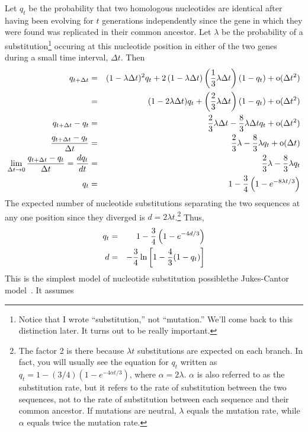 \documentclass[12pt]{article}
\begin{document}
Let $q_t$ be the probability that two homologous nucleotides are
identical after having been evolving for $t$ generations independently
since the gene in which they were found was replicated in their common
ancestor. Let $\lambda$ be the probability of a
substitution\footnote{Notice that I wrote ``substitution,'' not
  ``mutation.'' We'll come back to this distinction later. It turns
  out to be really important.} occuring
at this nucleotide position in either of the two genes during a small
time interval, $\Delta t$. Then
\begin{eqnarray*}
q_{t+\Delta t} &=& (1 - \lambda\Delta t)^2q_t
                  + 2\left(1 - \lambda\Delta t\right)\left({1 \over
                           3}\lambda\Delta t\right)(1 - q_t)
                  + \hbox{o}(\Delta t^2) \\
               &=& (1 - 2\lambda\Delta t)q_t + \left({2 \over 3}\lambda
                                                    \Delta t\right)
                                              (1 - q_t)
                  + \hbox{o}(\Delta t^2) \\
q_{t+\Delta t} - q_t &=& {2 \over 3}\lambda\Delta t - {8 \over
                           3}\lambda\Delta tq_t + \hbox{o}(\Delta t^2) \\
{q_{t+\Delta t} - q_t \over \Delta t} &=& {2 \over 3}\lambda - {8 \over
3}\lambda q_t + \hbox{o}(\Delta t) \\
\lim_{\Delta t\to 0}{q_{t+\Delta t} - q_t \over \Delta t}  = {dq_t \over dt} &=& {2 \over 3}\lambda - {8
\over 3}\lambda q_t \\
q_t &=& 1 - {3 \over 4}\left(1 - e^{-8\lambda t/3}\right) \\
\end{eqnarray*}
The expected number of nucleotide substitutions separating the two
sequences at any one position since they diverged is $d = 2\lambda
t$.\footnote{The factor 2 is there because $\lambda t$ substitutions
  are expected on each branch. In fact, you will usually see the
  equation for $q_t$ written as $q_t = 1 - (3/4)\left(1 - e^{-4\alpha
      t/3}\right)$, where $\alpha = 2\lambda$. $\alpha$ is also
  referred to as the substitution rate, but it refers to the rate of
  substitution between the two sequences, not to the rate of
  substitution between each sequence and their common ancestor. If
  mutations are neutral, $\lambda$ equals the mutation rate, while
  $\alpha$ equals twice the mutation rate.} Thus,
\begin{eqnarray*}
q_t &=& 1 - {3 \over 4}\left(1 - e^{-4d/3}\right) \\
d   &=& -{3 \over 4}\ln\left[1 - {4 \over 3}(1 - q_t)\right] \\
\end{eqnarray*}
This is the simplest model of nucleotide substitution
possible{\dash}the Jukes-Cantor model~\cite{Jukes-Cantor-1969}.
It assumes
\end{document}
